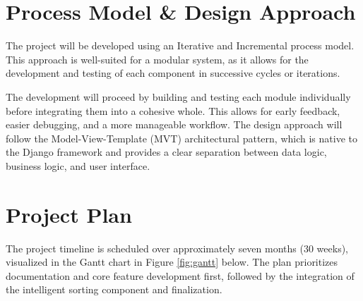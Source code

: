 \section{Process Model \& Design Approach}
The project will be developed using an Iterative and Incremental process model. This approach is well-suited for a modular system, as it allows for the development and testing of each component in successive cycles or iterations.

The development will proceed by building and testing each module individually before integrating them into a cohesive whole. This allows for early feedback, easier debugging, and a more manageable workflow. The design approach will follow the Model-View-Template (MVT) architectural pattern, which is native to the Django framework and provides a clear separation between data logic, business logic, and user interface.

\section{Project Plan}
The project timeline is scheduled over approximately seven months (30 weeks), visualized in the Gantt chart in Figure \ref{fig:gantt} below. The plan prioritizes documentation and core feature development first, followed by the integration of the intelligent sorting component and finalization.


